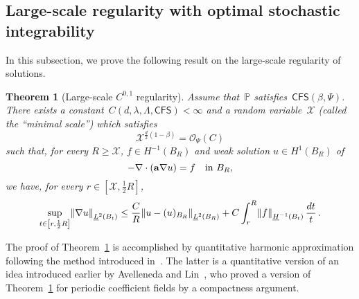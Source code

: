 \documentclass[11pt]{article} %
\numberwithin{equation}{section}
\newtheorem{theorem}{Theorem}[section]
\theoremstyle{definition}
\let\originalleft\left
\let\originalright\right
\renewcommand{\left}{\mathopen{}\mathclose\bgroup\originalleft}
\renewcommand{\right}{\aftergroup\egroup\originalright}
\renewcommand{\a}{\mathbf{a}}
\renewcommand{\P}{\mathbb{P}}
\newcommand{\X}{\mathcal{X}}
\renewcommand{\O}{\mathcal{O}}
\newcommand{\CFS}{\mathsf{CFS}}
\begin{document}
\subsection{Large-scale regularity with optimal stochastic integrability}
\label{ss.C01}




In this subsection, we prove the following result on the large-scale regularity of solutions. 

\begin{theorem}[{Large-scale $C^{0,1}$ regularity}]
\label{t.C01}
Assume that~$\P$ satisfies~$\CFS(\beta,\Psi)$. 
There exists a constant~$C(d,\lambda,\Lambda,\CFS)<\infty$ and a random variable~$\X$ (called the ``minimal scale'') which satisfies
\begin{equation}
\label{e.XLipschitz}
\X^{\frac d2(1-\beta)} 
= 
\O_{\Psi}(C) 
\end{equation}
such that, for every $R\geq \X$, $f\in H^{-1}(B_R)$ and weak solution $u\in H^1(B_{R})$ of
\begin{equation} 
\label{e.wksrt2}
-\nabla \cdot \left( \a\nabla u \right) = f \quad \mbox{in} \ B_{R},
\end{equation}
we have, for every $r \in [\X, \frac12 R]$, 
\begin{equation}
\label{e.Lipschitz}
\sup_{ t \in \left[r , \frac12 R\right]} \left\| \nabla u \right\|_{\underline{L}^2(B_{t})}
\leq
\frac{C}{R} \left\| u - ( u )_{B_{R}} \right\|_{\underline{L}^2(B_{R})} 
+ C \int_{r}^R \left\| f \right\|_{\underline{H}^{-1}(B_t)} \, \frac{dt}{t}
\,.
\end{equation}
\end{theorem}


\smallskip


The proof of Theorem~\ref{t.C01} is accomplished by quantitative harmonic approximation following the method  introduced in~\cite{AS}. The latter is a quantitative version of an idea introduced earlier by Avelleneda and Lin~\cite{AL1}, who proved a version of Theorem~\ref{t.C01} for periodic coefficient fields by a compactness argument.

\smallskip
\end{document}
